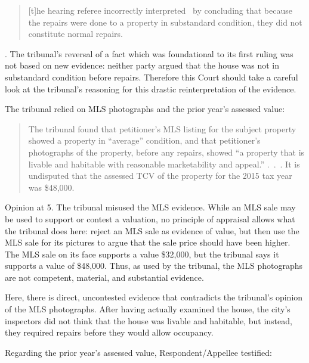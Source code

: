 \documentclass[12pt,\documentclassflag]{michiganCourtOfAppealsBrief}
\begin{document}
\begin{quote}
  [t]he hearing referee incorrectly interpreted \mathieuGast\ by concluding that because the repairs were done to a property in substandard condition, they did not constitute normal repairs.
\end{quote}
. 
The tribunal's reversal of a fact which was foundational to its first ruling was not based on new evidence: neither party argued that the house was not in substandard condition before repairs. Therefore this Court should take a careful look at the tribunal's reasoning for this drastic reinterpretation of the evidence.

The tribunal relied on MLS photographs and the prior year's assessed value:

\begin{quotation}
The tribunal found that
petitioner's MLS listing for the subject property showed a property in ``average'' condition, and
that petitioner's photographs of the property, before any repairs, showed ``a property that is livable
and habitable with reasonable marketability and appeal.'' .~.~.
It is undisputed that the assessed
TCV of the property for the 2015 tax year was \$48,000.
\end{quotation}
Opinion at 5. The tribunal misused the MLS evidence. While an MLS sale may be used to support or contest a valuation, no principle of appraisal allows what the tribunal does here: reject an MLS sale as evidence of value, but then use the MLS sale for its pictures to argue that the sale price should have been higher. The MLS sale on its face supports a value \$32,000, but the tribunal says it supports a value of \$48,000. Thus, as used by the tribunal, the MLS photographs are not competent, material, and substantial evidence. 

Here, there is direct, uncontested evidence that contradicts the tribunal's opinion of the MLS photographs. After having actually examined the house, the city's inspectors did not think that the house was livable and habitable, but instead, they required repairs before they would allow occupancy.

Regarding the prior year's assessed value, Respondent/Appellee testified:
\end{document}
